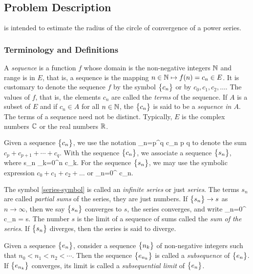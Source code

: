 \documentclass[12pt]{article}
\begin{document}
\subsection{Problem Description} \label{Sec_pd}

 is intended to estimate the radius of the circle of convergence of a power series.


\subsubsection{Terminology and  Definitions}\label{ssc:terminology-definitions}

A {\it sequence} is a function $f$ whose domain is the non-negative integers $\mathbb{N}$
and range is in $E$, that is, a sequence is the mapping $n \in \mathbb{N} \mapsto f(n) = c_n \in E$. It is customary
to denote the sequence $f$ by the symbol $\bigl\{ {c_n} \bigr\}$ or by $c_0, c_1, c_2, \ldots$.
The values of $f$, that is, the elements $c_n$ are called the {\it terms} of the sequence.
If $A$ is a subset of $E$ and if $c_n \in A$ for all $n \in \mathbb{N}$, the $\bigl\{ {c_n} \bigr\}$ is said to be
a {\it sequence in $A$}. The terms of a sequence need not be distinct. Typically, $E$ is
the complex numbers $\mathbb{C}$ or the real numbers $\mathbb{R}$.

Given a sequence $\bigl\{ {c_n} \bigr\}$, we use the notation
\EQ
{
  \sum_{n=p}^q c_n \qquad{}\qquad p \leq q
}
to denote the sum $c_p + c_{p+1} + \cdots + c_q$. With the sequence $\bigl\{ {c_n} \bigr\}$, we associate a sequence
$\bigl\{ {s_n} \bigr\}$, where
\EQ
{
  \label{eq:partial-sum}
  s_n  \sum_{k=0}^n c_k.
}
For the sequence $\bigl\{ {s_n} \bigr\}$, we may use the symbolic expression $c_0 + c_1 + c_2 + \ldots$ or
\EQ
{
  \label{eq:series-symbol}
  \sum_{n=0}^{\infty} c_n.
}

The symbol \eqref{series-symbol} is called an {\it infinite series} or just {\it series}. The
terms $s_n$ are called {\it partial sums} of the series, they are just numbers.
If $\bigl\{ {s_n} \bigr\} \rightarrow s$ as $n \rightarrow \infty$, then we say $\bigl\{ {s_n} \bigr\}$ converges to $s$,
the series converges, and write
\EQ
{
  \label{eq:series-limit}
  \sum_{n=0}^{\infty} c_n = s.
}
The number $s$ is the limit of a sequence of sums called the {\it sum of the series}. If $\bigl\{ {s_n} \bigr\}$
diverges, then the series is said to diverge.

Given a sequence $\bigl\{ {e_n} \bigr\}$, consider a sequence $\bigl\{ {n_k} \bigr\}$ of non-negative integers such that
$n_0 < n_1 < n_2 < \cdots$. Then the sequence $\bigl\{ {e_{n_k}} \bigr\}$ is called a {\it subsequence} of
$\bigl\{ {e_n} \bigr\}$. If $\bigl\{ {e_{n_k}} \bigr\}$ converges, its limit is called a {\it subsequential limit} of $\bigl\{ {e_n} \bigr\}$.
\end{document}
